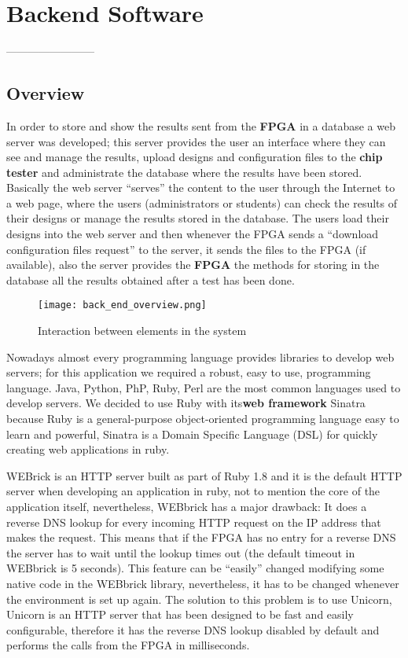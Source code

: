 \chapter{Backend Software}
------------------------

\section{Overview}
  In order to store and show the results sent from the {\bf FPGA} in a database a web server was developed; this server provides the user an interface where they can 
see and manage the results, upload designs and configuration files to the {\bf chip tester} and administrate the database where the results have been stored. Basically
the web server ``serves'' the content to the user through the Internet to a web page, where the users (administrators or students) can check the results of their designs
or manage the results stored in the database. The users load their designs into the web server and then whenever the FPGA sends a ``download configuration files request''
to the server, it sends the files to the FPGA (if available), also the server provides the {\bf FPGA} the methods for storing in the database all the results obtained after
a test has been done.

\begin{figure}[htb]
\centering
\texttt{[image: back\_end\_overview.png]}
\caption{Interaction between elements in the system}
\label{fig:back_end_structure}
\end{figure}


 Nowadays almost every programming language provides libraries to develop web servers; for this application we required a robust, easy to use, programming language. Java, Python, PhP, Ruby,
Perl are the most common languages used to develop servers. We decided to use Ruby with its{\bf web framework} Sinatra because Ruby is a general-purpose object-oriented programming language easy to learn
and powerful, Sinatra is a Domain Specific Language (DSL) for quickly creating web applications in ruby. 

WEBrick is an HTTP server built as part of Ruby 1.8 and it is the default HTTP server when
developing an application in ruby, not to mention the core of the application itself, nevertheless, WEBbrick has a major drawback: It does a reverse DNS lookup for every incoming HTTP request on 
the IP address that makes the request. This means that if the FPGA has no entry for a reverse DNS the server has to wait until the lookup times out (the default timeout in WEBbrick is 5 seconds). 
This feature can be ``easily'' changed modifying some native code in the WEBbrick library, nevertheless, it has to be changed whenever the environment is set up again. The solution to this problem is to
use Unicorn, Unicorn is an HTTP server that has been designed to be fast and easily configurable, therefore it has the reverse DNS lookup disabled by default and performs the calls from the FPGA in milliseconds.  

